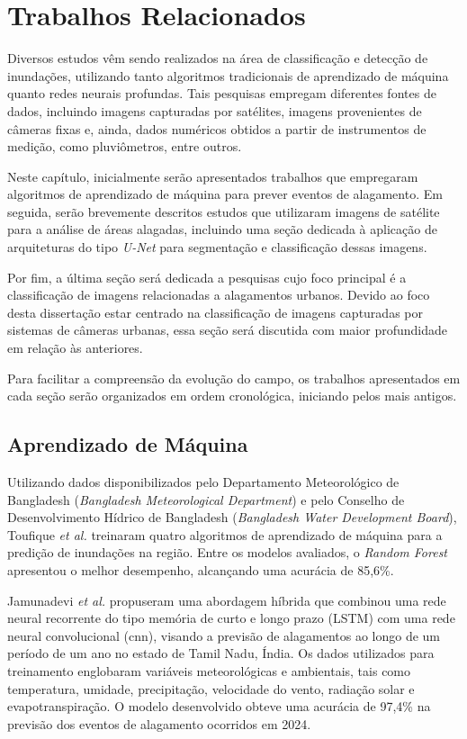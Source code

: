 \chapter{Trabalhos Relacionados}\label{cap:trabalhos}
Diversos estudos vêm sendo realizados na área de classificação e detecção de inundações, utilizando tanto algoritmos tradicionais de aprendizado de máquina quanto redes neurais profundas. Tais pesquisas empregam diferentes fontes de dados, incluindo imagens capturadas por satélites, imagens provenientes de câmeras fixas e, ainda, dados numéricos obtidos a partir de instrumentos de medição, como pluviômetros, entre outros.

Neste capítulo, inicialmente serão apresentados trabalhos que empregaram algoritmos de aprendizado de máquina para prever eventos de alagamento. Em seguida, serão brevemente descritos estudos que utilizaram imagens de satélite para a análise de áreas alagadas, incluindo uma seção dedicada à aplicação de arquiteturas do tipo \textit{U-Net} para segmentação e classificação dessas imagens.

Por fim, a última seção será dedicada a pesquisas cujo foco principal é a classificação de imagens relacionadas a alagamentos urbanos. Devido ao foco desta dissertação estar centrado na classificação de imagens capturadas por sistemas de câmeras urbanas, essa seção será discutida com maior profundidade em relação às anteriores.

Para facilitar a compreensão da evolução do campo, os trabalhos apresentados em cada seção serão organizados em ordem cronológica, iniciando pelos mais antigos.
\section{Aprendizado de Máquina}

Utilizando dados disponibilizados pelo Departamento Meteorológico de Bangladesh (\textit{Bangladesh Meteorological Department}) e pelo Conselho de Desenvolvimento Hídrico de Bangladesh (\textit{Bangladesh Water Development Board}), Toufique \textit{et al.} \cite{toufique2024} treinaram quatro algoritmos de aprendizado de máquina para a predição de inundações na região. Entre os modelos avaliados, o \textit{Random Forest} \cite{randomforest} apresentou o melhor desempenho, alcançando uma acurácia de 85,6\%.

Jamunadevi \textit{et al.} \cite{jamunadevi2024} propuseram uma abordagem híbrida que combinou uma rede neural recorrente do tipo memória de curto e longo prazo (LSTM) \cite{lstm} com uma rede neural convolucional (\acrshort{cnn}), visando a previsão de alagamentos ao longo de um período de um ano no estado de Tamil Nadu, Índia. Os dados utilizados para treinamento englobaram variáveis meteorológicas e ambientais, tais como temperatura, umidade, precipitação, velocidade do vento, radiação solar e evapotranspiração. O modelo desenvolvido obteve uma acurácia de 97,4\% na previsão dos eventos de alagamento ocorridos em 2024.

